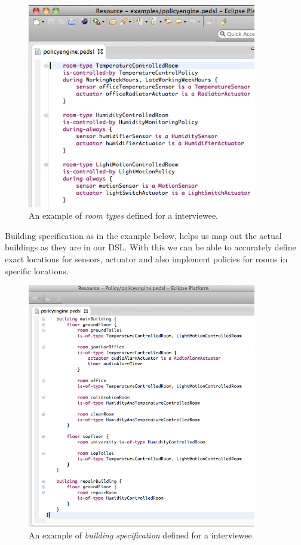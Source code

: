 \documentclass{llncs}
\begin{document}
\begin{figure}
  \centering
    \includegraphics[width=10cm]{dsl-room-types.png}
	\caption{An example of \textit{room types} defined for a interviewee.}
	\label{fig:room-types}
\end{figure}

\newpage
Building specification as in the example below, helps us map out the actual buildings as they are in our DSL. With this we can be able to accurately define exact locations for sensors, actuator and also implement policies for rooms in specific locations. 

\begin{figure}
  \centering
	 \includegraphics[width=10cm]{dsl-building-definition.png}  
	\caption{An example of \textit{building specification} defined for a interviewee.}
	\label{fig:dsl-building-definition}
\end{figure}
\end{document}
